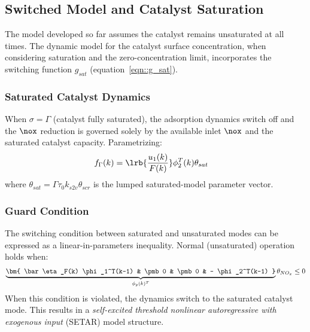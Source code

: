 \subsection{Switched Model and Catalyst Saturation \label{sec::switched_model}}

The model developed so far assumes the catalyst remains unsaturated at all times. The dynamic model for the catalyst
surface concentration, when considering saturation and the zero-concentration limit, incorporates the switching function
$g_{sat}$ (equation~\ref{eqn::g_sat}).

\subsubsection{Saturated Catalyst Dynamics}
When $\sigma = \Gamma$ (catalyst fully saturated), the adsorption dynamics switch off and the $\nox$ reduction is
governed solely by the available inlet $\nox$ and the saturated catalyst capacity. Parametrizing:
\begin{align}
    f_{\Gamma}(k) &= \lrb{\frac{u_1(k)}{F(k)}} \phi_2^T(k)  \theta_{sat}
    \label{eqn::gamma_scr}
\end{align}
where $\theta_{sat} = \Gamma \tau_0 k_{s2v} \theta_{scr}$ is the lumped saturated-model parameter vector.

\subsubsection{Guard Condition}
The switching condition between saturated and unsaturated modes can be expressed as a linear-in-parameters inequality.
Normal (unsaturated) operation holds when:
\begin{align}
    \underbrace{\bm{ \bar \eta_F(k) \phi_1^T(k-1)
                    & \pmb 0 & \pmb 0 & - \phi_2^T(k-1) }}_{\phi_g(k)^T}
                    \theta_{NO_x} \leq 0
    \label{eqn::guard_condition}
\end{align}
When this condition is violated, the dynamics switch to the saturated catalyst mode. This results in a
\textit{self-excited threshold nonlinear autoregressive with exogenous input} (SETAR) model structure.

